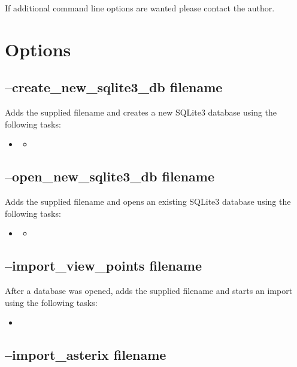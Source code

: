 If additional command line options are wanted please contact the author.

\section{Options}

\subsection{--create\_new\_sqlite3\_db filename}

Adds the supplied filename and creates a new SQLite3 database using the following tasks:

\begin{itemize}
\item {}
\begin{itemize}
 \item {}
 \end{itemize}
 \end{itemize}
 
\subsection{--open\_new\_sqlite3\_db filename}

Adds the supplied filename and opens an existing SQLite3 database using the following tasks:

\begin{itemize}
\item {}
\begin{itemize}
 \item {}
 \end{itemize}
 \end{itemize}

 \subsection{--import\_view\_points filename}

After a database was opened, adds the supplied filename and starts an import using the following tasks:

\begin{itemize}
 \item {}
\end{itemize}

 
\subsection{--import\_asterix filename}

